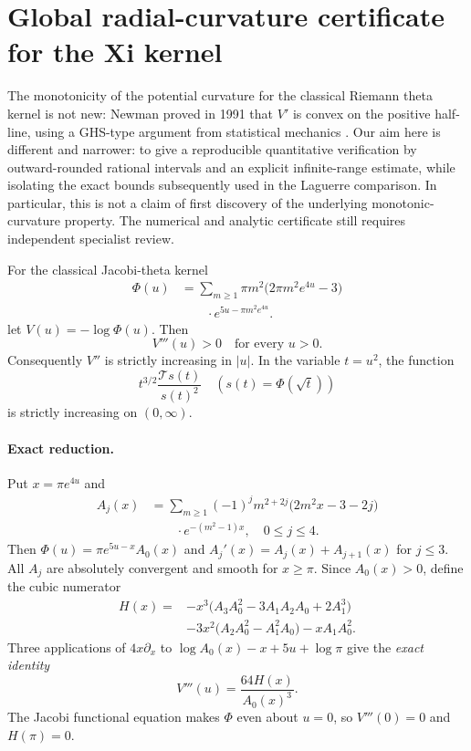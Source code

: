 \section{Global radial-curvature certificate for the Xi kernel}
\label{sec:globalcurvature}

The monotonicity of the potential curvature for the
classical Riemann theta kernel is not new: Newman proved
in 1991 that $V'$ is convex on the positive half-line,
using a GHS-type argument from statistical mechanics
\cite{NewmanGHS}. Our aim here is different and narrower:
to give a reproducible quantitative verification by
outward-rounded rational intervals and an explicit
infinite-range estimate, while isolating the exact
bounds subsequently used in the Laguerre comparison.
In particular, this is not a claim of first discovery
of the underlying monotonic-curvature property.
The numerical and analytic certificate still requires
independent specialist review.

\begin{theorem}
\label{thm:globalcurvature}
For the classical Jacobi-theta kernel
\begin{align*}
\Phi(u)&=\sum_{m\ge1}\pi m^2
  \bigl(2\pi m^2e^{4u}-3\bigr)\\
&\qquad\cdot e^{5u-\pi m^2e^{4u}}.
\end{align*}
let $V(u)=-\log\Phi(u)$. Then
\begin{equation}\label{eq:globalthird}
\boxed{V'''(u)>0\quad\text{for every }u>0.}
\end{equation}
Consequently $V''$ is strictly increasing in
$|u|$. In the variable $t=u^2$, the function
\[
t^{3/2}\frac{\mathcal Ts(t)}{s(t)^2}
\quad (s(t)=\Phi(\sqrt t))
\]
is strictly increasing on $(0,\infty)$.
\end{theorem}

\paragraph{Exact reduction.}
Put $x=\pi e^{4u}$ and
\begin{align}\label{eq:Aj}
A_j(x)&=\sum_{m\ge1}(-1)^j m^{2+2j}
 \bigl(2m^2x-3-2j\bigr)\nonumber\\
&\qquad\cdot e^{-(m^2-1)x},
\quad 0\le j\le4.
\end{align}
Then
$\Phi(u)=\pi e^{5u-x}A_0(x)$ and
$A_j'(x)=A_j(x)+A_{j+1}(x)$ for $j\le3$.
All $A_j$ are absolutely convergent and
smooth for $x\ge\pi$. Since $A_0(x)>0$,
define the cubic numerator
\begin{align}
H(x)={}&-x^3
\bigl(A_3A_0^2-3A_1A_2A_0+2A_1^3\bigr)
\nonumber\\
&-3x^2\bigl(A_2A_0^2-A_1^2A_0\bigr)
-xA_1A_0^2.
\label{eq:H}
\end{align}
Three applications of $4x\partial_x$ to
$\log A_0(x)-x+5u+\log\pi$ give the
\emph{exact identity}
\begin{equation}\label{eq:thirdH}
V'''(u)=\frac{64H(x)}{A_0(x)^3}.
\end{equation}
The Jacobi functional equation makes $\Phi$
even about $u=0$, so $V'''(0)=0$ and
$H(\pi)=0$.

